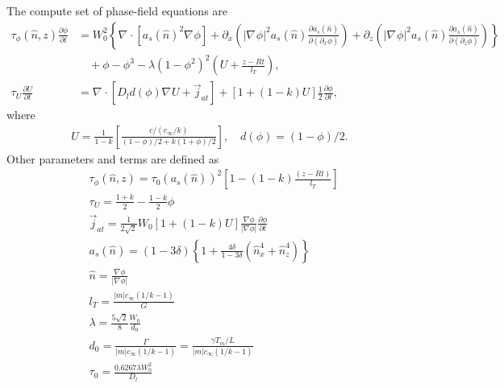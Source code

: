 \documentclass[a4paper,12pt]{article}
\renewcommand{\div}[1]{\nabla_{#1} \cdot}
\newcommand{\grad}[1]{\nabla_{#1}}
\begin{document}
The compute set of phase-field equations are 
\begin{align}
\tau_{\phi} (\hat{n},z) \frac{\partial \phi}{\partial t} &= W^2_0 \left\{ \div{} [a_s(\hat{n})^2 \grad{} \phi] +  \partial_x \left( |\grad{} \phi|^2 a_s(\hat{n}) \frac{\partial a_s(\hat{n})}{\partial (\partial_x \phi)}  \right)  +
\partial_z \left( |\grad{} \phi|^2 a_s(\hat{n}) \frac{\partial a_s(\hat{n})}{\partial (\partial_z \phi)}  \right)  \right \}  \nonumber \\
& \quad + \phi - \phi^3 - \lambda (1-\phi^2)^2 \left(U + \frac{z-R t}{ l_T} \right),  \label{eq:micro_phi}\\
\tau_U \frac{\partial U}{\partial t} &= \div{} [D_l d(\phi) \grad{} U + \vec{j}_{at}] + [1+(1-k)U]\frac{1}{2}  \frac{\partial \phi}{\partial t}, \label{eq:micro_U}
\end{align}
where 
\begin{align}
U = \frac{1}{1-k} \left[ \frac{c/(c_{\infty}/k)}{(1-\phi)/2 + k(1+\phi)/2} \right], \quad d(\phi) = (1-\phi)/2 .
\end{align}
Other parameters and terms are defined as
\begin{align}
    & \tau_{\phi}(\hat{n},z) = \tau_0(a_s(\hat{n}))^2 \left[1-(1-k) \frac{(z-Rt)}{ l_T} \right] \\
	& \tau_U = \frac{1+k}{2} - \frac{1-k}{2}\phi \\
	& \vec{j}_{at} =  \frac{1}{2\sqrt{2}} W_0 [1+(1-k)U] \frac{\nabla \phi}{|\nabla \phi|} \frac{\partial \phi}{\partial t} \\
	& a_{s}(\hat{n}) = (1-3\delta)\left\{1+\frac{4 \delta}{1-3\delta}(\hat{n}_x^4 + \hat{n}_z^4) \right\} \\
    & \hat{n} =  \frac{\nabla \phi}{|\nabla \phi|} \\
    & l_T = \frac{|m|c_{\infty}(1/k-1)}{G} \\
    & \lambda =  \frac{5\sqrt{2}}{8}  \frac{W_0}{d_0} \\
    & d_0 = \frac{\Gamma}{|m|c_{\infty}(1/k-1)} = \frac{\gamma T_m/L}{|m|c_{\infty}(1/k-1)}  \\
    & \tau_0 =  \frac{0.6267\lambda W_0^2}{D_l}
\end{align}
\end{document}
